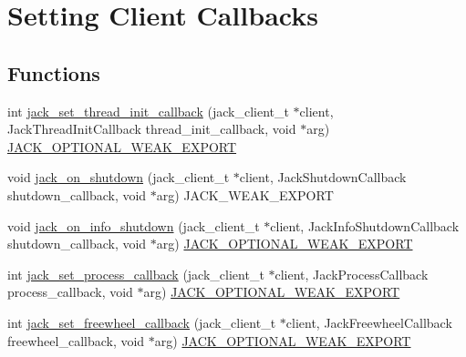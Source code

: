 \hypertarget{group__ClientCallbacks}{\section{\-Setting \-Client \-Callbacks}
\label{d7/d4f/group__ClientCallbacks}
}
\subsection*{\-Functions}
\begin{DoxyCompactItemize}
\item 
int \hyperlink{group__ClientCallbacks_gad5a6904292f5c9790223c18aeab202bf}{jack\-\_\-set\-\_\-thread\-\_\-init\-\_\-callback} (jack\-\_\-client\-\_\-t $\ast$client, \-Jack\-Thread\-Init\-Callback thread\-\_\-init\-\_\-callback, void $\ast$arg) \hyperlink{weakmacros_8h_adf1bde0dd996bbf61a44311165014dd1}{\-J\-A\-C\-K\-\_\-\-O\-P\-T\-I\-O\-N\-A\-L\-\_\-\-W\-E\-A\-K\-\_\-\-E\-X\-P\-O\-R\-T}
\item 
void \hyperlink{group__ClientCallbacks_gac23222530f27e0fc3a4b3a033036abdb}{jack\-\_\-on\-\_\-shutdown} (jack\-\_\-client\-\_\-t $\ast$client, \-Jack\-Shutdown\-Callback shutdown\-\_\-callback, void $\ast$arg) \-J\-A\-C\-K\-\_\-\-W\-E\-A\-K\-\_\-\-E\-X\-P\-O\-R\-T
\item 
void \hyperlink{group__ClientCallbacks_ga2a23a30390a65f7f1a4f66315647413a}{jack\-\_\-on\-\_\-info\-\_\-shutdown} (jack\-\_\-client\-\_\-t $\ast$client, \-Jack\-Info\-Shutdown\-Callback shutdown\-\_\-callback, void $\ast$arg) \hyperlink{weakmacros_8h_adf1bde0dd996bbf61a44311165014dd1}{\-J\-A\-C\-K\-\_\-\-O\-P\-T\-I\-O\-N\-A\-L\-\_\-\-W\-E\-A\-K\-\_\-\-E\-X\-P\-O\-R\-T}
\item 
int \hyperlink{group__ClientCallbacks_gafb5ec9fb4b736606d676c135fb97888b}{jack\-\_\-set\-\_\-process\-\_\-callback} (jack\-\_\-client\-\_\-t $\ast$client, \-Jack\-Process\-Callback process\-\_\-callback, void $\ast$arg) \hyperlink{weakmacros_8h_adf1bde0dd996bbf61a44311165014dd1}{\-J\-A\-C\-K\-\_\-\-O\-P\-T\-I\-O\-N\-A\-L\-\_\-\-W\-E\-A\-K\-\_\-\-E\-X\-P\-O\-R\-T}
\item 
int \hyperlink{group__ClientCallbacks_gae797e2cde20faecb9be510c8873fbdd6}{jack\-\_\-set\-\_\-freewheel\-\_\-callback} (jack\-\_\-client\-\_\-t $\ast$client, \-Jack\-Freewheel\-Callback freewheel\-\_\-callback, void $\ast$arg) \hyperlink{weakmacros_8h_adf1bde0dd996bbf61a44311165014dd1}{\-J\-A\-C\-K\-\_\-\-O\-P\-T\-I\-O\-N\-A\-L\-\_\-\-W\-E\-A\-K\-\_\-\-E\-X\-P\-O\-R\-T}
\item 

\end{DoxyCompactItemize}
